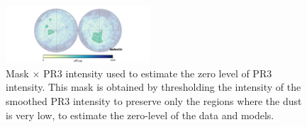 \documentclass[twocolumn]{aastex631}
\begin{document}
\begin{figure}[ht!]
    \centering
    \includegraphics[width=0.48\textwidth]{figures/mask_intxPR3_zero_lvl.png}
    \caption{Mask $\times$ PR3 intensity used to estimate the zero level of PR3 intensity. This mask is obtained by thresholding the intensity of the smoothed PR3 intensity to preserve only the regions where the dust is very low, to estimate the zero-level of the data and models.}%
    \label{fig:mask_zero_lvl_int}
\end{figure}
\end{document}
